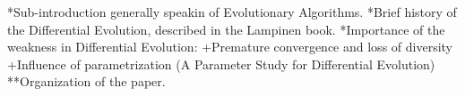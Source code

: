 *Sub-introduction generally speakin of Evolutionary Algorithms.
*Brief history of the Differential Evolution, described in the Lampinen book.
*Importance of the weakness in Differential Evolution:
  +Premature convergence and loss of diversity
  +Influence of parametrization (A Parameter Study for Differential Evolution)
**Organization of the paper.
